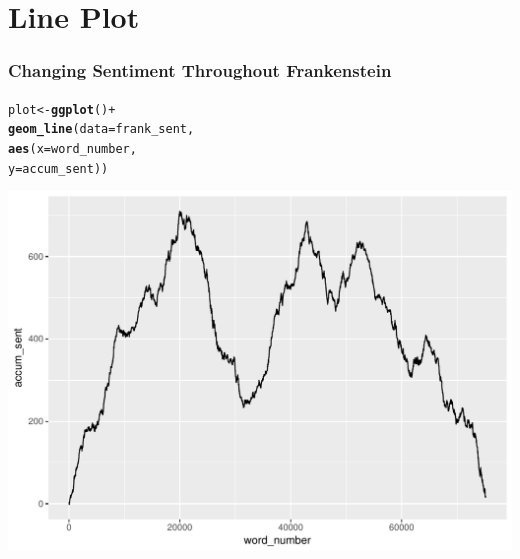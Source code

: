 \documentclass{beamer}\usepackage[]{graphicx}\usepackage[]{color}
\makeatletter
\def\maxwidth{ %
  \ifdim\Gin@nat@width>\linewidth
    \linewidth
  \else
    \Gin@nat@width
  \fi
}
\newcommand{\hlopt}[1]{\textcolor[rgb]{0,0,0}{#1}}%
\newcommand{\hlstd}[1]{\textcolor[rgb]{0.345,0.345,0.345}{#1}}%
\newcommand{\hlkwb}[1]{\textcolor[rgb]{0.69,0.353,0.396}{#1}}%
\newcommand{\hlkwc}[1]{\textcolor[rgb]{0.333,0.667,0.333}{#1}}%
\newcommand{\hlkwd}[1]{\textcolor[rgb]{0.737,0.353,0.396}{\textbf{#1}}}%
\newenvironment{kframe}{%
 \def\at@end@of@kframe{}%
 \ifinner\ifhmode%
  \def\at@end@of@kframe{\end{minipage}}%
  \begin{minipage}{\columnwidth}%
 \fi\fi%
 \def\FrameCommand##1{\hskip\@totalleftmargin \hskip-\fboxsep
 \colorbox{shadecolor}{##1}\hskip-\fboxsep
     \hskip-\linewidth \hskip-\@totalleftmargin \hskip\columnwidth}%
 \MakeFramed {\advance\hsize-\width
   \@totalleftmargin\z@ \linewidth\hsize
   \@setminipage}}%
 {\par\unskip\endMakeFramed%
 \at@end@of@kframe}
\newenvironment{knitrout}{}{} %
\makeatother
\begin{document}
\section{Line Plot}
\begin{frame}
  \frametitle{Changing Sentiment Throughout Frankenstein}
\begin{knitrout}
\color{fgcolor}\begin{kframe}
\begin{alltt}
 \hlstd{plot} \hlkwb{<-} \hlkwd{ggplot}\hlstd{()}\hlopt{+}
\hlkwd{geom_line}\hlstd{(}\hlkwc{data} \hlstd{= frank_sent,}
          \hlkwd{aes}\hlstd{(}\hlkwc{x} \hlstd{= word_number,}
              \hlkwc{y} \hlstd{= accum_sent))}
\end{alltt}
\end{kframe}
\end{knitrout}

\framebreak
\begin{knitrout}
\color{fgcolor}
\includegraphics[width=\maxwidth]{figure/unnamed-chunk-14-1} 

\end{knitrout}

\end{frame}
\end{document}
